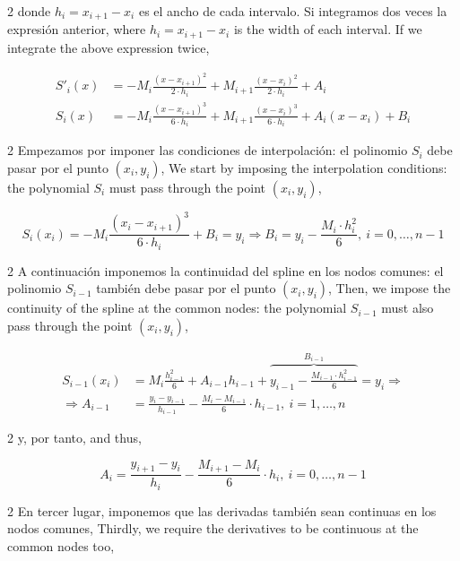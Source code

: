 \begin{paracol}{2}
donde $h_i=x_{i+1}-x_i$ es el ancho de cada intervalo. Si integramos dos veces la expresión anterior,
\switchcolumn
where $h_i=x_{i+1}-x_i$ is the width of each interval. If we integrate the above expression twice,
\end{paracol}
\begin{align*}
S'_i(x)&=-M_i\frac{(x-x_{i+1})^2}{2\cdot h_i}+M_{i+1}\frac{(x-x_i)^2}{2\cdot h_i}+A_i\\
S_i(x)&=-M_i\frac{(x-x_{i+1})^3}{6\cdot h_i}+M_{i+1}\frac{(x-x_i)^3}{6\cdot h_i}+A_i(x-x_i)+B_i
\end{align*}
\begin{paracol}{2}
Empezamos por imponer las condiciones de interpolación: el polinomio $S_i$ debe pasar por el punto $(x_i,y_i)$,
\switchcolumn
We start by imposing the interpolation conditions: the polynomial $S_i$ must pass through the point $(x_i,y_i)$,
\end{paracol}
\begin{equation*}
S_i(x_i)=-M_i\frac{(x_i-x_{i+1})^3}{6\cdot h_i}+B_i=y_i \Rightarrow B_i=y_i-\frac{M_i\cdot h_i^2}{6},\ i=0,\dots, n-1
\end{equation*}
\begin{paracol}{2}
A continuación imponemos la continuidad del spline en los nodos comunes: el polinomio $S_{i-1}$ también debe pasar por el punto $(x_i, y_i)$,
\switchcolumn
Then, we impose the continuity of the spline at the common nodes: the polynomial $S_{i-1}$ must also pass through the point $(x_i, y_i)$,
\end{paracol}
\begin{align*}
S_{i-1}(x_i)&=M_i\frac{h_{i-1}^2}{6}+A_{i-1}h_{i-1}+\overbrace{y_{i-1}-\frac{M_{i-1}\cdot h_{i-1}^2}{6}}^{B_{i-1}}=y_i \Rightarrow\\
\Rightarrow A_{i-1}&=\frac{y_i-y_{i-1}}{h_{i-1}}-\frac{M_i-M_{i-1}}{6}\cdot h_{i-1}, \ i=1,\dots, n
\end{align*}
\begin{paracol}{2}
y, por tanto,
\switchcolumn
and thus,
\end{paracol}
\begin{equation*}
A_i=\frac{y_{i+1}-y_i}{h_i}-\frac{M_{i+1}-M_i}{6}\cdot h_i, \ i=0,\dots, n-1
\end{equation*}
\begin{paracol}{2}
En tercer lugar, imponemos que las derivadas también sean continuas en los nodos comunes,
\switchcolumn
Thirdly, we require the derivatives to be continuous at the common nodes too,
\end{paracol}
